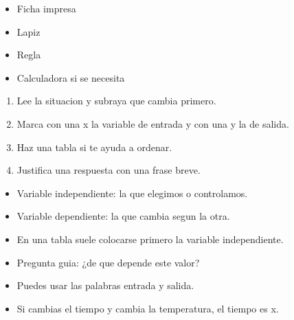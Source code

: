 \documentclass[12pt,a4paper]{article}
\begin{document}
        \FichaCabecera

        \begin{materialesbox}
        \begin{itemize}
    \item Ficha impresa
    \item Lapiz
    \item Regla
    \item Calculadora si se necesita
\end{itemize}
        \end{materialesbox}

        \begin{pasosbox}
        \begin{enumerate}
    \item Lee la situacion y subraya que cambia primero.
    \item Marca con una x la variable de entrada y con una y la de salida.
    \item Haz una tabla si te ayuda a ordenar.
    \item Justifica una respuesta con una frase breve.
\end{enumerate}
        \end{pasosbox}

        \begin{recordatoriobox}
        \begin{itemize}
    \item Variable independiente: la que elegimos o controlamos.
    \item Variable dependiente: la que cambia segun la otra.
    \item En una tabla suele colocarse primero la variable independiente.
\end{itemize}
        \end{recordatoriobox}

        \begin{apoyobox}
        \begin{itemize}
    \item Pregunta guia: ¿de que depende este valor?
    \item Puedes usar las palabras entrada y salida.
    \item Si cambias el tiempo y cambia la temperatura, el tiempo es x.
\end{itemize}
        \end{apoyobox}


\end{document}
